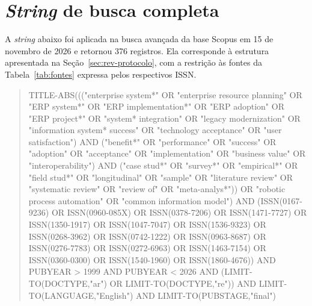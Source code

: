 \chapter{\textit{String} de busca completa}
\label{ap:string}

A \textit{string} abaixo foi aplicada na busca avançada da base Scopus em 15 de novembro de 2026 e retornou 376 registros. Ela corresponde à estrutura apresentada na Seção~\ref{sec:rev-protocolo}, com a restrição às fontes da Tabela~\ref{tab:fontes} expressa pelos respectivos ISSN.

\begin{quote}
\raggedright\small\ttfamily
TITLE-ABS((("enterprise system*" OR "enterprise resource planning" OR "ERP system*" OR "ERP implementation*" OR "ERP adoption" OR "ERP project*" OR "system* integration" OR "legacy modernization" OR "information system* success" OR "technology acceptance" OR "user satisfaction") AND ("benefit*" OR "performance" OR "success" OR "adoption" OR "acceptance" OR "implementation" OR "business value" OR "interoperability") AND ("case stud*" OR "survey*" OR "empirical*" OR "field stud*" OR "longitudinal" OR "sample" OR "literature review" OR "systematic review" OR "review of" OR "meta-analys*")) OR "robotic process automation" OR "common information model") AND (ISSN(0167-9236) OR ISSN(0960-085X) OR ISSN(0378-7206) OR ISSN(1471-7727) OR ISSN(1350-1917) OR ISSN(1047-7047) OR ISSN(1536-9323) OR ISSN(0268-3962) OR ISSN(0742-1222) OR ISSN(0963-8687) OR ISSN(0276-7783) OR ISSN(0272-6963) OR ISSN(1463-7154) OR ISSN(0360-0300) OR ISSN(1540-1960) OR ISSN(1860-4676)) AND PUBYEAR > 1999 AND PUBYEAR < 2026 AND (LIMIT-TO(DOCTYPE,"ar") OR LIMIT-TO(DOCTYPE,"re")) AND LIMIT-TO(LANGUAGE,"English") AND LIMIT-TO(PUBSTAGE,"final")
\end{quote}
